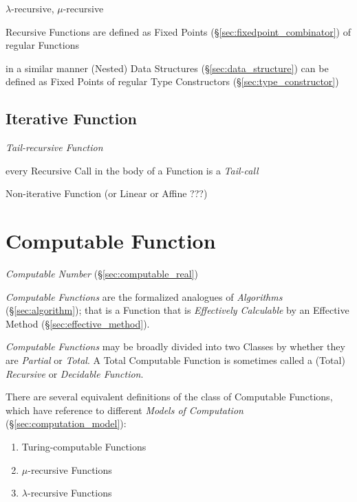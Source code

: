 $\lambda$-recursive, $\mu$-recursive


Recursive Functions are defined as Fixed Points
(\S\ref{sec:fixedpoint_combinator}) of regular Functions

in a similar manner (Nested) Data Structures
(\S\ref{sec:data_structure}) can be defined as Fixed Points of regular
Type Constructors (\S\ref{sec:type_constructor})



\subsection{Iterative Function}\label{sec:iterative_function}

\emph{Tail-recursive Function}

every Recursive Call in the body of a Function is a \emph{Tail-call}

Non-iterative Function (or Linear or Affine ???) %



\section{Computable Function}\label{sec:computable_function}

\emph{Computable Number} (\S\ref{sec:computable_real})

\emph{Computable Functions} are the formalized analogues of
\emph{Algorithms} (\S\ref{sec:algorithm}); that is a Function that
is \emph{Effectively Calculable} by an Effective Method
(\S\ref{sec:effective_method}).

\emph{Computable Functions} may be broadly divided into two Classes by
whether they are \emph{Partial} or \emph{Total}. A Total Computable
Function is sometimes called a (Total) \emph{Recursive} or
\emph{Decidable Function}.

There are several equivalent definitions of the class of Computable
Functions, which have reference to different \emph{Models of
  Computation} (\S\ref{sec:computation_model}):
\begin{enumerate}
\item Turing-computable Functions
\item $\mu$-recursive Functions
\item $\lambda$-recursive Functions
\end{enumerate}



